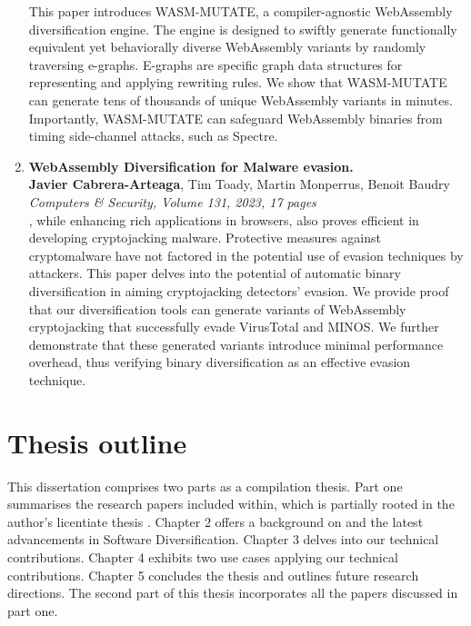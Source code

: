 \begin{enumerate}[label={\textbf{\Roman*}:}, ref={\Roman*}]
	This paper introduces WASM-MUTATE, a compiler-agnostic WebAssembly diversification engine. 
	The engine is designed to swiftly generate functionally equivalent yet behaviorally diverse WebAssembly variants by randomly traversing e-graphs.
	E-graphs are specific graph data structures for representing and applying rewriting rules.  
	We show that WASM-MUTATE can generate tens of thousands of unique WebAssembly variants in minutes. 
	Importantly, WASM-MUTATE can safeguard WebAssembly binaries from timing side-channel attacks, such as Spectre.



	\item \label{evasionpaper} \textbf{WebAssembly Diversification for Malware evasion.} \\ 
	\textbf{Javier Cabrera-Arteaga}, Tim Toady, Martin Monperrus, Benoit Baudry\\
	\textit{Computers \& Security, Volume 131, 2023, 17 pages} \\

	  \Wasm, while enhancing rich applications in browsers, also proves efficient in developing cryptojacking malware. 
	Protective measures against cryptomalware have not factored in the potential use of evasion techniques by attackers. 
	This paper delves into the potential of automatic binary diversification in aiming \Wasm cryptojacking detectors' evasion. 
	We provide proof that our diversification tools can generate variants of WebAssembly cryptojacking that successfully evade VirusTotal and MINOS. 
	We further demonstrate that these generated variants introduce minimal performance overhead, thus verifying binary diversification as an effective evasion technique.

\end{enumerate}



\section{Thesis outline}
This dissertation comprises two parts as a compilation thesis. 
Part one summarises the research papers included within, which is partially rooted in the author's licentiate thesis \cite{Lic}. 
Chapter 2 offers a background on \Wasm and the latest advancements in Software Diversification.  
Chapter 3 delves into our technical contributions. 
Chapter 4 exhibits two use cases applying our technical contributions. 
Chapter 5 concludes the thesis and outlines future research directions. 
The second part of this thesis incorporates all the papers discussed in part one.

